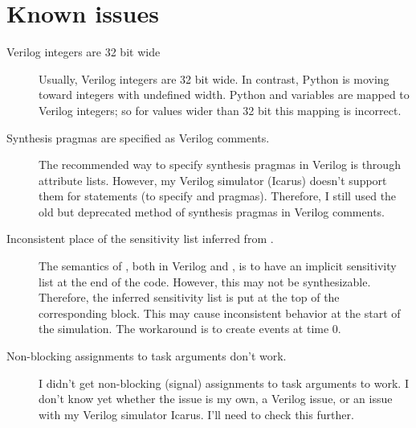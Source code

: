 \section{Known issues\label{conv-issues}}
\begin{description}
\item[Verilog integers are 32 bit wide]
Usually, Verilog integers are 32 bit wide. In contrast, Python is
moving toward integers with undefined width. Python  
and  variables are mapped to Verilog integers; so for values
wider than 32 bit this mapping is incorrect.

\item[Synthesis pragmas are specified as Verilog comments.] The recommended
way to specify synthesis pragmas in Verilog is through attribute
lists. However, my Verilog simulator (Icarus) doesn't support them
for  statements (to specify  and
 pragmas). Therefore, I still used the old
but deprecated method of synthesis pragmas in Verilog comments.

\item[Inconsistent place of the sensitivity list inferred from .]
The semantics of , both in Verilog and \myhdl{}, is to
have an implicit sensitivity list at the end of the code. However, this
may not be synthesizable. Therefore, the inferred sensitivity list is
put at the top of the corresponding  block.
This may cause inconsistent behavior at the start of the
simulation. The workaround is to create events at time 0.

\item[Non-blocking assignments to task arguments don't work.] 
I didn't get non-blocking (signal) assignments to task arguments to
work.  I don't know yet whether the issue is my own, a Verilog issue,
or an issue with my Verilog simulator Icarus. I'll need to check this
further.

\end{description}
